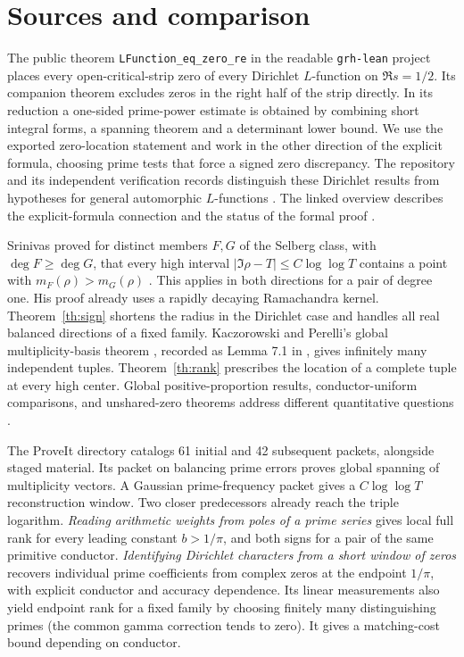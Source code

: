 \documentclass[11pt]{article}
\begin{document}
\section{Sources and comparison}
The public theorem \texttt{LFunction\_eq\_zero\_re} in the readable
\texttt{grh-lean} project places every open-critical-strip zero of every Dirichlet
$L$-function on $\Re s=1/2$. Its companion theorem excludes zeros in the right
half of the strip directly. In its reduction a one-sided prime-power estimate
is obtained by combining short integral forms, a spanning theorem and a
determinant lower bound. We use the exported zero-location statement and
work in the other direction of the explicit formula, choosing prime tests
that force a signed zero discrepancy. The repository and its independent
verification records distinguish these Dirichlet results from hypotheses for
general automorphic $L$-functions \cite{lean,checks}. The linked overview
describes the explicit-formula connection and the status of the formal proof
\cite{wiki}.

Srinivas proved for distinct members $F,G$ of the Selberg class, with
$\deg F\ge \deg G$, that every high interval $|\Im\rho-T|\le C\log\log T$
contains a point with $m_F(\rho)>m_G(\rho)$ \cite{srinivas}. This applies
in both directions for a pair of degree one. His proof already uses a rapidly
decaying Ramachandra kernel. Theorem~\ref{th:sign} shortens the radius in the
Dirichlet case and handles all real balanced directions of a fixed family.
Kaczorowski and Perelli's global multiplicity-basis theorem \cite{kp}, recorded as
Lemma 7.1 in \cite{perelli}, gives infinitely many independent tuples.
Theorem~\ref{th:rank} prescribes the location of a complete tuple at every high
center. Global positive-proportion results, conductor-uniform comparisons,
and unshared-zero theorems address different quantitative questions
\cite{bp,banks,bl}.

The ProveIt directory \cite{proveit} catalogs 61 initial and 42 subsequent
packets, alongside staged material. Its packet on balancing prime errors
proves global spanning of multiplicity vectors. A Gaussian prime-frequency
packet gives a $C\log\log T$ reconstruction window. Two closer predecessors
already reach the triple logarithm. \emph{Reading arithmetic weights from
poles of a prime series} \cite{pole} gives local full rank for every leading
constant $b>1/\pi$, and both signs for a pair of the same primitive conductor.
\emph{Identifying Dirichlet characters from a short window of zeros}
\cite{euler} recovers individual prime coefficients from complex zeros at
the endpoint $1/\pi$, with explicit conductor and accuracy dependence.
Its linear measurements also yield endpoint rank for a fixed family by
choosing finitely many distinguishing primes (the common gamma correction
tends to zero). It gives a matching-cost bound depending on conductor.
\end{document}
